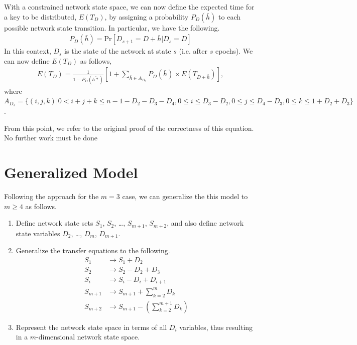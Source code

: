 \documentclass[a4paper,10pt]{article}
\begin{document}
With a constrained network state space, we can now define the expected time for a key to be distributed, $E(T_D)$, 
by assigning a probability $P_D(\bar{h})$ to each possible network state transition. In particular, we have the following.
\begin{align*}
P_D(\bar{h}) = \text{Pr}[D_{s+1} = D + \bar{h} | D_s = D]
\end{align*}
In this context, $D_s$ is the state of the network at state $s$ (i.e. after $s$ epochs). We can now define $E(T_D)$ as 
follows,
\begin{align*}
E(T_D) = \frac{1}{1 - P_D(\bar{h*})}[1 + \sum_{\bar{h} \in A_{D_s}} P_D(\bar{h}) \times E(T_{D + \bar{h}})],
\end{align*}
where $A_{D_s} = \{ (i, j, k) | 0 < i + j + k \leq n - 1 - D_2 - D_3 - D_4, 0 \leq i \leq D_3 - D_2, 0 \leq j \leq D_4 - D_3, 0 \leq k \leq 1 + D_2 + D_3\}$.

From this point, we refer to the original proof of the correctness of this equation. No further work must be done

\section{Generalized Model}
Following the approach for the $m = 3$ case, we can generalize the this model to $m \geq 4$ as follows.
\begin{enumerate}
	\item Define network state sets $S_1$, $S_2$, \dots, $S_{m+1}$, $S_{m+2}$, and also define network state variables $D_2$, \dots, $D_m$, $D_{m+1}$.
	\item Generalize the transfer equations to the following.
	\begin{align*}
		S_1 & \rightarrow S_1 + D_2 \\
		S_2 & \rightarrow S_2 - D_2 + D_3 \\
		S_i & \rightarrow S_i - D_i + D_{i+1} \\
		S_{m+1} & \rightarrow S_{m+1} + \sum_{k=2}^{m}D_k \\
		S_{m+2} & \rightarrow S_{m+1} - (\sum_{k=2}^{m+1}D_k) 
	\end{align*}
	\item Represent the network state space in terms of all $D_i$ variables, thus resulting in a $m$-dimensional network 
	state space. 
\end{enumerate}

\end{document}

